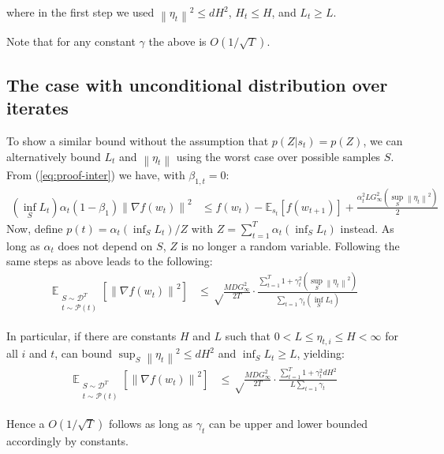 \documentclass{article}
\newcommand{\norm}[1]{\left\lVert{#1}\right\rVert}
\renewcommand{\eqref}[1]{(\ref{#1})}
\newcommand{\currw}{w_t}
\newcommand{\nextw}{w_{t+1}}
\newcommand{\curre}{\eta_t}
\newcommand{\currei}{\eta_{t,i}}
\newcommand{\curra}{\alpha_t}
\newcommand{\normed}[1]{\left\lVert {#1} \right\rVert}
\newcommand{\bone}{\beta_1}
\newcommand{\bonet}{\beta_{1,t}}
\newcommand{\fdist}{D}
\newcommand{\smooth}{M}
\newcommand{\lowinf}{L}
\newcommand{\lowinft}{L_{t}}
\newcommand{\highinf}{H}
\newcommand{\highinft}{H_{t}}
\newcommand{\gradb}{G_\infty}
\newcommand{\expec}[2]{\mathbb E_{#1} \left[ {#2} \right]}
\newcommand{\dist}{\mathcal D}
\begin{document}
where in the first step we used $\norm{\curre}^2 \leq d \highinf^2$, $\highinft \leq \highinf$, and $\lowinft \geq \lowinf$.

Note that for any constant $\gamma$ the above is $O(1 / \sqrt T)$.

\subsection{The case with unconditional distribution over iterates}
\label{sec:proof2-unconditional}

To show a similar bound without the assumption that $p(Z|s_t) = p(Z)$, we can alternatively bound $\lowinft$ and $\norm{\curre}$ using the worst case over possible samples $S$. From \eqref{eq:proof-inter} we have, with $\bonet = 0$:
\begin{equation}
\begin{split}
	\left( \inf_{S} \lowinft \right) \curra (1 - \bone) \normed{\nabla f(\currw)}^2 & \leq f(\currw) - \expec{s_t}{f(\nextw)} + \frac{\curra^2 L \gradb^2 \left(\sup_S \norm{\curre}^2 \right)}2
\end{split}
\end{equation}
Now, define $p(t) = \alpha_t \left(\inf_S \lowinft\right) / Z$ with $Z = \sum_{t=1}^T \alpha_t \left(\inf_S \lowinft\right)$ instead. As long as $\alpha_t$ does not depend on $S$, $Z$ is no longer a random variable. Following the same steps as above leads to the following:
\begin{equation}
\begin{split}
     \expec{\substack{S \sim \dist^T \\ t \sim \mathcal P(t)}}{\normed{\nabla f(\currw)}^2} & \leq \sqrt\frac{\smooth \fdist \gradb^2}{2T} \cdot \frac{\sum_{t=1}^T 1 + \gamma_t^2 \left(\sup_S \norm{\curre}^2 \right) }{\sum_{t=1} \gamma_t \left(\inf_S \lowinft\right)}
\end{split}
\end{equation}

In particular, if there are constants $\highinf$ and $\lowinf$ such that
$0 < \lowinf \leq \currei \leq \highinf < \infty$ for all $i$ and $t$, can bound $\sup_S \norm{\curre}^2 \leq d \highinf^2$ and $\inf_S \lowinft \geq \lowinf$, yielding:
\begin{equation}
\begin{split}
     \expec{\substack{S \sim \dist^T \\ t \sim \mathcal P(t)}}{\normed{\nabla f(\currw)}^2} & \leq \sqrt\frac{\smooth \fdist \gradb^2}{2T} \cdot \frac{\sum_{t=1}^T 1 + \gamma_t^2 d \highinf^2}{\lowinf \sum_{t=1} \gamma_t}
\end{split}
\end{equation}

Hence a $O(1 / \sqrt T)$ follows as long as $\gamma_t$ can be upper and lower bounded accordingly by constants. 
\end{document}

